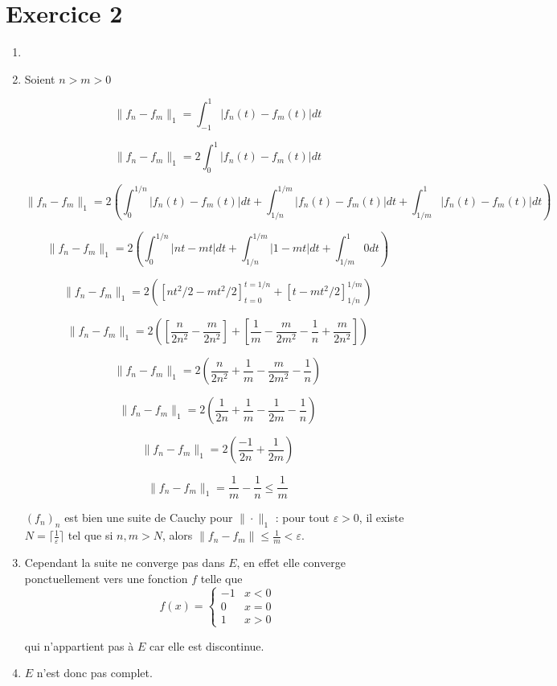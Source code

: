 \documentclass[]{article}
\theoremstyle{remark}
\theoremstyle{definition}
\begin{document}
\section*{Exercice 2}

\begin{enumerate}
	\item
	\item Soient $n > m > 0$
	
	$$\|f_n - f_m\|_1 = \int_{-1}^{1} |f_n(t) - f_m(t)|dt$$
	
	$$\|f_n - f_m\|_1 = 2\int_{0}^{1} |f_n(t) - f_m(t)|dt$$

	$$\|f_n - f_m\|_1 = 2\left(\int_{0}^{1/n} |f_n(t) - f_m(t)|dt + \int_{1/n}^{1/m} |f_n(t) - f_m(t)|dt + \int_{1/m}^{1} |f_n(t) - f_m(t)|dt\right)$$
	
	$$\|f_n - f_m\|_1 = 2\left(\int_{0}^{1/n} |nt - mt|dt + \int_{1/n}^{1/m} |1 - mt|dt + \int_{1/m}^{1} 0dt\right)$$

	$$\|f_n - f_m\|_1 = 2\left(\left[nt^2/2 - mt^2/2\right]_{t=0}^{t=1/n} + \left[t - mt^2/2\right]_{1/n}^{1/m}\right)$$
	
	$$\|f_n - f_m\|_1 = 2\left(\left[\frac{n}{2n^2} - \frac{m}{2n^2}\right] + \left[\frac{1}{m} - \frac{m}{2m^2} - \frac{1}{n} + \frac{m}{2n^2}\right]\right)$$
	
	$$\|f_n - f_m\|_1 = 2\left(\frac{n}{2n^2} + \frac{1}{m} - \frac{m}{2m^2} - \frac{1}{n}\right)$$
	
	$$\|f_n - f_m\|_1 = 2\left(\frac{1}{2n} + \frac{1}{m} - \frac{1}{2m} - \frac{1}{n}\right)$$
	
	$$\|f_n - f_m\|_1 = 2\left(\frac{-1}{2n} + \frac{1}{2m}\right)$$
	
	$$\|f_n - f_m\|_1 = \frac{1}{m} - \frac{1}{n} \leqslant \frac{1}{m}$$
	
	$(f_n)_n$ est bien une suite de Cauchy pour $\|\cdot\|_1$ : pour tout $\varepsilon > 0$, il existe $N = \lceil\frac{1}{\varepsilon}\rceil$ tel que si $n, m > N$, alors $\|f_n - f_m\| \leqslant \frac{1}{m} < \varepsilon$.
	
	\item Cependant la suite ne converge pas dans $E$, en effet elle converge ponctuellement vers une fonction $f$ telle que
	$$f(x) = \left\{
	\begin{array}{ll}
		-1 & x < 0\\
		0 & x = 0\\
		1 & x > 0
	\end{array}
	\right.$$
	
	qui n'appartient pas à $E$ car elle est discontinue.
	
	\item $E$ n'est donc pas complet.
\end{enumerate}
\end{document}
